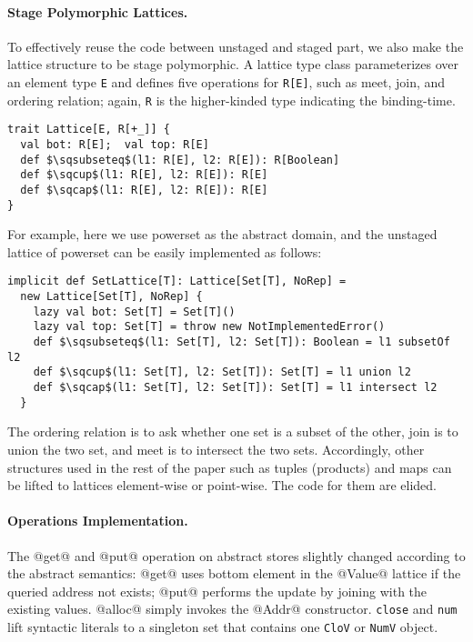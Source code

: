 \paragraph{Stage Polymorphic Lattices.}
To effectively reuse the code between unstaged and staged part, we also make the lattice structure to
be stage polymorphic. A lattice type class parameterizes over an element type \texttt{E} and defines
five operations for \texttt{R[E]}, such as meet, join, and ordering relation; again, \texttt{R} 
is the higher-kinded type indicating the binding-time.
\begin{lstlisting}
trait Lattice[E, R[+_]] {
  val bot: R[E];  val top: R[E]
  def $\sqsubseteq$(l1: R[E], l2: R[E]): R[Boolean]
  def $\sqcup$(l1: R[E], l2: R[E]): R[E]
  def $\sqcap$(l1: R[E], l2: R[E]): R[E]
}
\end{lstlisting}

For example, here we use powerset as the abstract domain, and the unstaged lattice 
of powerset can be easily implemented as follows:

\begin{lstlisting}
implicit def SetLattice[T]: Lattice[Set[T], NoRep] = 
  new Lattice[Set[T], NoRep] {
    lazy val bot: Set[T] = Set[T]()
    lazy val top: Set[T] = throw new NotImplementedError()
    def $\sqsubseteq$(l1: Set[T], l2: Set[T]): Boolean = l1 subsetOf l2
    def $\sqcup$(l1: Set[T], l2: Set[T]): Set[T] = l1 union l2
    def $\sqcap$(l1: Set[T], l2: Set[T]): Set[T] = l1 intersect l2
  }
\end{lstlisting}

The ordering relation is to ask whether one set is a subset of the other, 
join is to union the two set, and meet is to intersect the two sets.
Accordingly, other structures used in the rest of the paper such as tuples 
(products) and maps can be lifted to lattices element-wise or point-wise.
The code for them are elided.

\paragraph{Operations Implementation.}
The @get@ and @put@ operation on abstract stores slightly changed according to
the abstract semantics: @get@ uses bottom element in the @Value@ lattice if the queried
address not exists; @put@ performs the update by joining with the existing values.
@alloc@ simply invokes the @Addr@ constructor.
\texttt{close} and \texttt{num} lift syntactic literals to a singleton set that
contains one \texttt{CloV} or \texttt{NumV} object.

